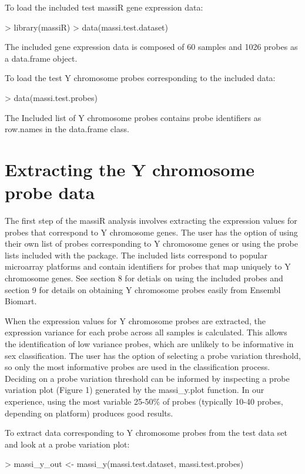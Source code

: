 \documentclass{article}
\begin{document}
To load the included test massiR gene expression data:
\begin{Schunk}
\begin{Sinput}
> library(massiR)
> data(massi.test.dataset)
\end{Sinput}
\end{Schunk}
The included gene expression data is composed of 60 samples and 1026 probes as a data.frame object.

To load the test Y chromosome probes corresponding to the included data:
\begin{Schunk}
\begin{Sinput}
> data(massi.test.probes)
\end{Sinput}
\end{Schunk}
The Included list of Y chromosome probes contains probe identifiers as row.names in the data.frame class.

\section{Extracting the Y chromosome probe data}
The first step of the massiR analysis involves extracting the expression values for probes that correspond to Y chromosome genes. 
The user has the option of using their own list of probes corresponding to Y chromosome genes or using the probe lists included with the package. The included lists correspond to popular microarray platforms and contain identifiers for probes that map uniquely to Y chromosome genes. See section 8 for detials on using the included probes and section 9 for details on obtaining Y chromosome probes easily from Ensembl Biomart.

When the expression values for Y chromosome probes are extracted, the expression variance for each probe across all samples is calculated. This allows the identification of low variance probes, which are unlikely to be informative in sex classification. The user has the option of selecting a probe variation threshold, so only the most informative probes are used in the classification process. Deciding on a probe variation threshold can be informed by inspecting a probe variation plot (Figure 1) generated by the massi_y.plot function. In our experience, using the most variable 25-50\% of probes (typically 10-40 probes, depending on platform) produces good results. 

To extract data corresponding to Y chromosome probes from the test data set and look at a probe variation plot:

\begin{Schunk}
\begin{Sinput}
> massi_y_out <- massi_y(massi.test.dataset, massi.test.probes)
\end{Sinput}
\end{Schunk}
\end{document}
